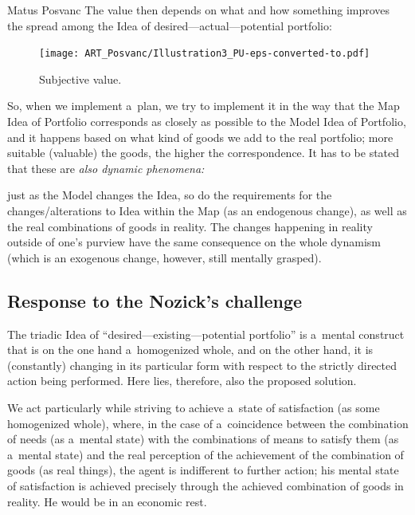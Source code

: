 \begin{artengenv}{Matus Posvanc}
The value then depends on what and how something improves the spread among the Idea of desired---actual---potential portfolio:


\begin{figure}
 \begin{center}
 \texttt{[image: ART\_Posvanc/Illustration3\_PU-eps-converted-to.pdf]}%
 \end{center}%
 \caption{Subjective value.}\label{pos:fig3}
\end{figure}



So, when we implement a~plan, we try to implement it in the way that the Map Idea of Portfolio corresponds as closely as possible to the Model Idea of Portfolio, and it happens based on what kind of goods we add to the real portfolio; more suitable (valuable) the goods, the higher the correspondence. It has to be stated that these are \textit{also dynamic phenomena:}

just as the Model changes the Idea, so do the requirements for the changes/alterations to Idea within the Map (as an endogenous change), as well as the real combinations of goods in reality. The changes happening in reality outside of one's purview have the same consequence on the whole dynamism (which is an exogenous change, however, still mentally grasped).



\subsection*{Response to the Nozick's challenge}



The triadic Idea of ``desired---existing---potential portfolio'' is a~mental construct that is on the one hand a~homogenized whole, and on the other hand, it is (constantly) changing in its particular form with respect to the strictly directed action being performed. Here lies, therefore, also the proposed solution.



We act particularly while striving to achieve a~state of satisfaction (as some homogenized whole), where, in the case of a~coincidence between the combination of needs (as a~mental state) with the combinations of means to satisfy them (as a~mental state) and the real perception of the achievement of the combination of goods (as real things), the agent is indifferent to further action; his mental state of satisfaction is achieved precisely through the achieved combination of goods in reality. He would be in an economic rest.




\end{artengenv}
